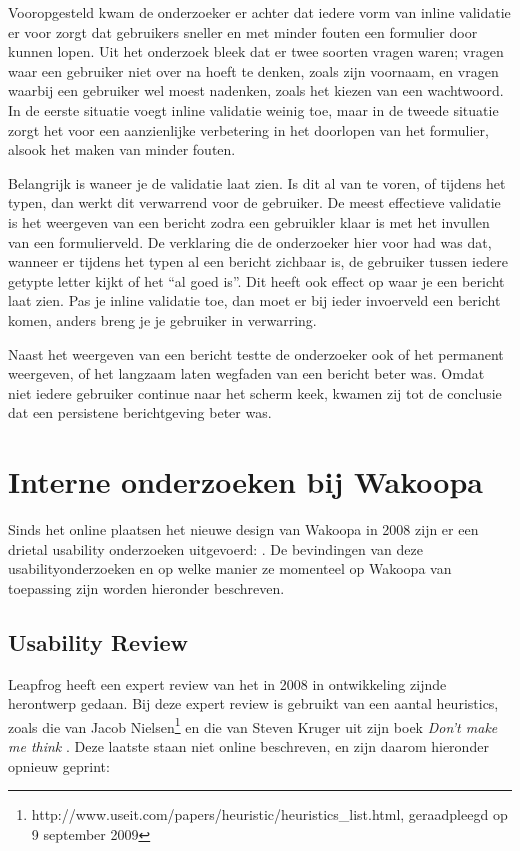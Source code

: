 \documentclass[a4paper, 10pt, pdftex]{report}
\begin{document}
    Vooropgesteld kwam de onderzoeker er achter  dat iedere vorm van inline validatie er voor zorgt dat gebruikers sneller en met minder fouten een formulier door kunnen lopen. Uit het onderzoek bleek dat er twee soorten vragen waren; vragen waar een gebruiker niet over na hoeft te denken, zoals zijn voornaam, en vragen waarbij een gebruiker wel moest nadenken, zoals het kiezen van een wachtwoord. In de eerste situatie voegt inline validatie weinig toe, maar in de tweede situatie zorgt het voor een aanzienlijke verbetering in het doorlopen van het formulier, alsook het maken van minder fouten.

    Belangrijk is waneer je de validatie laat zien. Is dit al van te voren, of tijdens het typen, dan werkt dit verwarrend voor de gebruiker. De meest effectieve validatie is het weergeven van een bericht zodra een gebruikler klaar is met het invullen van een formulierveld. De verklaring die de onderzoeker hier voor had was dat, wanneer er tijdens het typen al een bericht zichbaar is, de gebruiker tussen iedere getypte letter kijkt of het ``al goed is''. Dit heeft ook effect op waar je een bericht laat zien. Pas je inline validatie toe, dan moet er bij ieder invoerveld een bericht komen, anders breng je je gebruiker in verwarring.

    Naast het weergeven van een bericht testte de onderzoeker ook of het permanent weergeven, of het langzaam laten wegfaden van een bericht beter was. Omdat niet iedere gebruiker continue naar het scherm keek, kwamen zij tot de conclusie dat een persistene berichtgeving beter was.

  \section{Interne onderzoeken bij Wakoopa}
    Sinds het online plaatsen het nieuwe design van Wakoopa in 2008 zijn er een drietal usability onderzoeken uitgevoerd: \citet{Timmerman2008, Hoekman2008, Alfrink2008}. De bevindingen van deze usabilityonderzoeken en op welke manier ze momenteel op Wakoopa van toepassing zijn worden hieronder beschreven.

    \subsection{Usability Review \citet{Alfrink2008}}
    Leapfrog heeft een expert review van het in 2008 in ontwikkeling zijnde herontwerp gedaan. Bij deze expert review is gebruikt van een aantal heuristics, zoals die van Jacob Nielsen\footnote{http://www.useit.com/papers/heuristic/heuristics\_list.html, geraadpleegd op 9 september 2009} en die van Steven Kruger uit zijn boek \emph{Don't make me think} \citep{Krug2000}. Deze laatste staan niet online beschreven, en zijn daarom hieronder opnieuw geprint:
\end{document}
